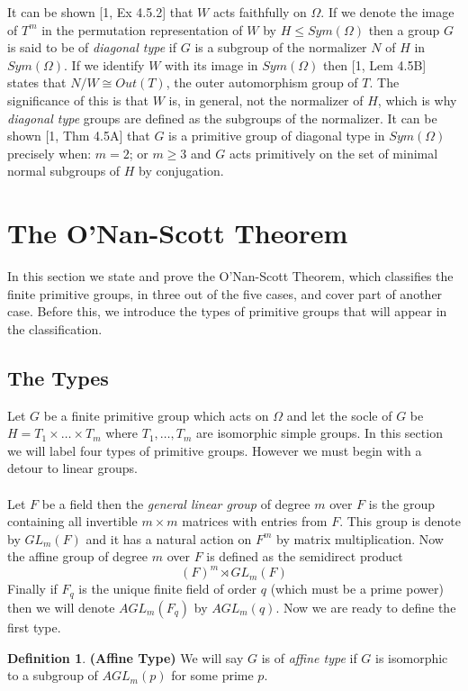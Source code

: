 \documentclass[]{article}
\theoremstyle{definition}
\newtheorem{defn}[thm]{Definition}
\begin{document}
It can be shown [1, Ex 4.5.2] that $W$ acts faithfully on $\Omega$. If we denote the image of $T^m$ in the permutation representation of $W$ by $H\leqslant Sym(\Omega)$ then a group $G$ is said to be of \emph{diagonal type} if $G$ is a subgroup of the normalizer $N$ of $H$ in $Sym(\Omega)$. If we identify $W$ with its image in $Sym(\Omega)$ then [1, Lem 4.5B] states that $N/W \cong Out(T)$, the outer automorphism group of $T$. The significance of this is that $W$ is, in general, not the normalizer of $H$, which is why \emph{diagonal type} groups are defined as the subgroups of the normalizer. It can be shown [1, Thm 4.5A] that $G$ is a primitive group of diagonal type in $Sym(\Omega)$ precisely when: $m=2$; or $m\geq 3$ and $G$ acts primitively on the set of minimal normal subgroups of $H$ by conjugation. 
\clearpage
\section{The O'Nan-Scott Theorem} \label{sec:ONS}
In this section we state and prove the O'Nan-Scott Theorem, which classifies the finite primitive groups, in three out of the five cases, and cover part of another case. Before this, we introduce the types of primitive groups that will appear in the classification.

\subsection{The Types}
Let $G$ be a finite primitive group which acts on $\Omega$ and let the socle of $G$ be $H=T_1 \times \dots \times T_m$ where $T_1,\dots,T_m$ are isomorphic simple groups. In this section we will label four types of primitive groups. However we must begin with a detour to linear groups.
\\
\\
Let $F$ be a field then the \emph{general linear group} of degree $m$ over $F$ is the group containing all invertible $m \times m$ matrices with entries from $F$. This group is denote by $GL_m(F)$ and it has a natural action on $F^m$ by matrix multiplication. Now the affine group of degree $m$ over $F$ is defined as the semidirect product
$$(F)^m \rtimes GL_m(F)$$  
Finally if $F_q$ is the unique finite field of order $q$ (which must be a prime power) then we will denote $AGL_m(F_q)$ by $AGL_m(q)$. Now we are ready to define the first type.

\begin{defn} \textbf{(Affine Type)}
	We will say $G$ is of \emph{affine type} if $G$ is isomorphic to a subgroup of $AGL_m(p)$ for some prime $p$.
\end{defn}
\end{document}
